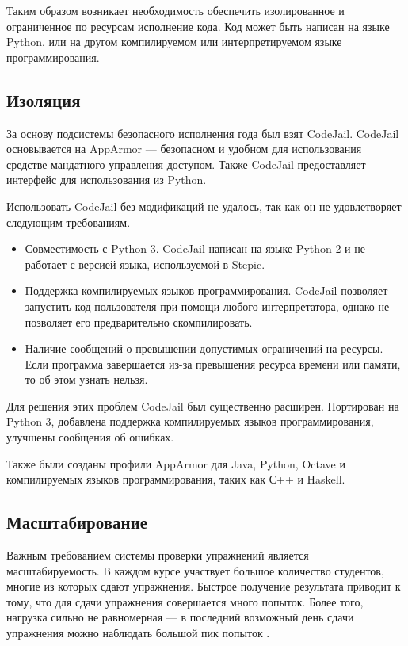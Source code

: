 \documentclass{matmex-diploma-custom}
\begin{document}
Таким образом возникает необходимость обеспечить изолированное
и ограниченное по ресурсам исполнение кода. Код может быть написан на
языке Python, или на другом компилируемом или интерпретируемом
языке программирования.

\subsection{Изоляция}
За основу подсистемы безопасного исполнения года был взят
CodeJail. CodeJail основывается на AppArmor --- безопасном \cite{Bauer} и удобном
для использования \cite{Schreuders} средстве мандатного управления
доступом. Также CodeJail предоставляет интерфейс для использования из
Python.

Использовать CodeJail без модификаций не удалось, так как он не
удовлетворяет следующим требованиям.

\begin{itemize}
\item Совместимость с Python 3. CodeJail написан на языке Python 2 и
  не работает с версией языка, используемой в Stepic.
\item Поддержка компилируемых языков программирования. CodeJail
  позволяет запустить код пользователя при помощи любого
  интерпретатора, однако не позволяет его предварительно
  скомпилировать.
\item Наличие сообщений о превышении допустимых ограничений на
  ресурсы. Если программа завершается из-за превышения ресурса времени
  или памяти, то об этом узнать нельзя.
\end{itemize}


Для решения этих проблем CodeJail был существенно
расширен. Портирован на Python 3, добавлена поддержка компилируемых
языков программирования, улучшены сообщения об ошибках.

Также были созданы профили AppArmor для Java, Python, Octave и
компилируемых языков программирования, таких как С++ и Haskell.

\subsection{Масштабирование}
Важным требованием системы проверки упражнений является
масштабируемость. В каждом курсе участвует большое количество
студентов, многие из которых сдают упражнения. Быстрое получение
результата приводит к тому, что для сдачи упражнения совершается много
попыток. Более того, нагрузка сильно не равномерная --- в последний
возможный день сдачи упражнения можно наблюдать большой пик
попыток \cite{breslow2013studying}.
\end{document}
